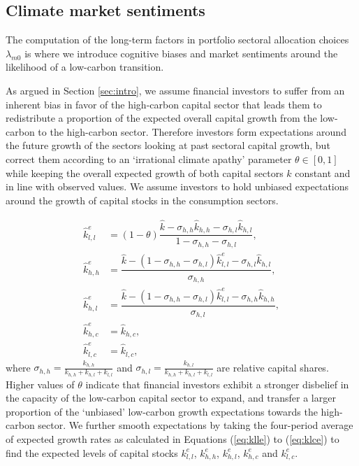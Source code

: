 \documentclass[authoryear]{article}
\begin{document}
\subsection{Climate market sentiments}
\label{sec:exp}

The computation of the long-term factors in portfolio sectoral allocation choices $\lambda_{m0}$ is where we introduce cognitive biases and market sentiments around the likelihood of a low-carbon transition. 

As argued in Section \ref{sec:intro}, we assume financial investors to suffer from an inherent bias in favor of the high-carbon capital sector that leads them to redistribute a proportion of the expected overall capital growth from the low-carbon to the high-carbon sector. Therefore investors form expectations around the future growth of the sectors looking at past sectoral capital growth, but correct them according to an `irrational climate apathy' parameter $\theta\in[0,1]$ while keeping the overall expected growth of both capital sectors $\hat{k}$ constant and in line with observed values. We assume investors to hold unbiased expectations around the growth of capital stocks in the consumption sectors. 

\begin{align}
\hat{k}_{l,l}^e &= (1-\theta) \dfrac{\hat{k} - \sigma_{h,h} \hat{k}_{h,h} - \sigma_{h,l} \hat{k}_{h,l}}{1-\sigma_{h,h}- \sigma_{h,l}}, \label{eq:klle}\\
\hat{k}_{h,h}^e &= \dfrac{\hat{k}-(1- \sigma_{h,h}-\sigma_{h,l}) \hat{k}^e_{l,l} - \sigma_{h,l}\hat{k}_{h,l}}{\sigma_{h,h}}, \label{eq:khhe}\\
\hat{k}_{h,l}^e &= \dfrac{\hat{k}-(1- \sigma_{h,h}-\sigma_{h,l}) \hat{k}^e_{l,l} - \sigma_{h,h}\hat{k}_{h,h}}{\sigma_{h,l}}, \label{eq:khle}\\
\hat{k}_{h,c}^e &= \hat{k}_{h,c}, \label{eq:khce}\\
\hat{k}_{l,c}^e &= \hat{k}_{l,c}, \label{eq:klce}
\end{align}
where $\sigma_{h,h} = \frac{k_{h,h}}{k_{h,h} + k_{h,l} + k_{l,l}}$ and $\sigma_{h,l} = \frac{k_{h,l}}{k_{h,h} + k_{h,l} + k_{l,l}}$ are relative capital shares. Higher values of $\theta$ indicate that financial investors exhibit a stronger disbelief in the capacity of the low-carbon capital sector to expand, and transfer a larger proportion of the `unbiased' low-carbon growth expectations towards the high-carbon sector. We further smooth expectations by taking the four-period average of expected growth rates as calculated in Equations (\ref{eq:klle}) to (\ref{eq:klce}) to find the expected levels of capital stocks $k_{l,l}^e$, $k_{h,h}^e$, $k_{h,l}^e$, $k_{h,c}^e$ and $k_{l,c}^e$.
\end{document}
